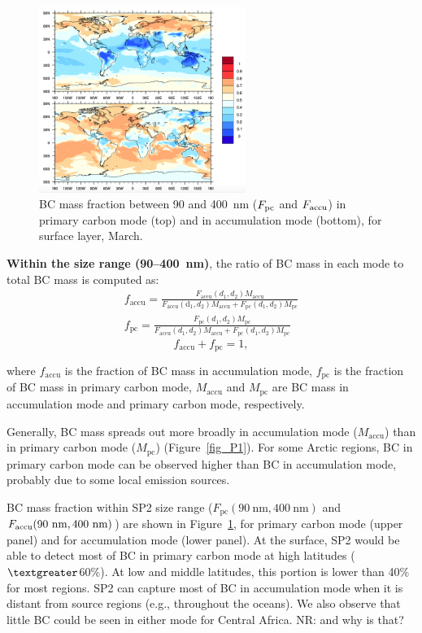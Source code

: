 \documentclass[11pt]{article}
\newcommand{\nrtodo}[1]{{\color{blue} NR: #1}}
\begin{document}
	\begin{figure}[!h] 
		\begin{center}
			\includegraphics[width = 0.6\textwidth]{Rplot02}
			\caption[]{\label{fig_P2} BC mass fraction between 90 and 400~nm ($F_{\rm pc}$ and $F_{\rm accu}$) in primary carbon mode (top) and in accumulation mode (bottom), for surface layer, March.}
		\end{center}
	\end{figure}
	
	
	\textbf{Within the size range (90--400~nm)}, the ratio of BC mass in each mode to total BC mass is computed as:
	\begin{align*}
	f_{\text{accu}} = \frac{F_{\text{accu}}(d_{1}, d_{2})M_{\text{accu}}}{F_{\text{accu}}(\text{d}_{1}, d_{2})M_{\text{accu}}+F_{\text{pc}}(d_{1}, d_{2})M_{\text{pc}}}\\
	f_{\text{pc}} = \frac{F_{\text{pc}}(d_{1}, d_{2})M_{\text{pc}}}{F_{\text{accu}}(d_{1}, d_{2})M_{\text{accu}}+F_{\text{pc}}(d_{1}, d_{2})M_{\text{pc}}}
	\end{align*}
	\[f_{\text{accu}} + f_{\text{pc}} = 1,\]
	
	where $f_{\text{accu}}$ is the fraction of BC mass in
	accumulation mode, $f_{\text{pc}}$ is the fraction of BC mass in
	primary carbon mode, $M_{\text{accu}}$ and $M_{\text{pc}}$ are BC mass
	in accumulation mode and primary carbon mode, respectively.
	
	Generally, BC mass spreads out more broadly in accumulation mode ($M_{\text{accu}}$) than in primary carbon mode ($M_{\text{pc}}$) (Figure~\ref{fig_P1}). For some Arctic regions, BC in primary carbon mode can be observed higher than BC in accumulation mode, probably due to some local emission sources.
	
	BC mass fraction within SP2 size range ($F_{\text{pc}}(90~\text{nm}, 400~\text{nm})$ and
	$F_{\text{accu}}(90~\rm nm, 400~\rm nm)$) are shown in Figure~\ref{fig_P2}, for primary carbon mode
	(upper panel) and for accumulation mode (lower panel). At the surface,
	SP2 would be able to detect most of BC in primary
	carbon mode at high latitudes ($\textgreater$60$\%$).  At low and
	middle latitudes, this portion is lower than 40$\%$ for most
	regions. SP2 can capture most of BC in accumulation mode when it is
	distant from source regions (e.g., throughout the oceans). We also
	observe that little BC could be seen in either mode for Central
	Africa. \nrtodo{and why is that?} 
	
\end{document}
